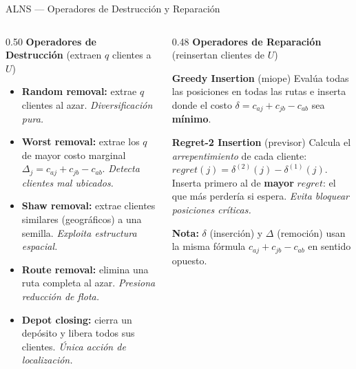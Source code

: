 \documentclass[aspectratio=169,10pt]{beamer}
\begin{document}
\begin{frame}{ALNS --- Operadores de Destrucción y Reparación}
  \begin{columns}[T,onlytextwidth]
    \begin{column}{0.50\textwidth}
      {\color{myblue}\textbf{Operadores de Destrucción}}
      {\footnotesize(extraen $q$ clientes a $U$)}
      \vspace{0.2em}
      \begin{itemize}\small\setlength{\itemsep}{0.25em}
        \item \textbf{Random removal:}
              extrae $q$ clientes al azar.
              \textit{Diversificación pura.}
        \item \textbf{Worst removal:}
              extrae los $q$ de mayor costo marginal
              $\Delta_j = c_{aj} + c_{jb} - c_{ab}$.
              \textit{Detecta clientes mal ubicados.}
        \item \textbf{Shaw removal:}
              extrae clientes similares (geográficos) a una semilla.
              \textit{Exploita estructura espacial.}
        \item \textbf{Route removal:}
              elimina una ruta completa al azar.
              \textit{Presiona reducción de flota.}
        \item \textbf{Depot closing:}
              cierra un depósito y libera todos sus clientes.
              \textit{Única acción de localización.}
      \end{itemize}
    \end{column}
    \begin{column}{0.48\textwidth}
      {\color{mygreen}\textbf{Operadores de Reparación}}
      {\footnotesize(reinsertan clientes de $U$)}
      \vspace{0.15em}
      \begin{block}{\textbf{Greedy Insertion} (miope)}\footnotesize
        Evalúa todas las posiciones en todas las rutas e inserta
        donde el costo $\delta = c_{aj}+c_{jb}-c_{ab}$ sea \textbf{mínimo}.
      \end{block}
      \vspace{0.15em}
      \begin{block}{\textbf{Regret-2 Insertion} (previsor)}\footnotesize
        Calcula el \textit{arrepentimiento} de cada cliente:
        $regret(j) = \delta^{(2)}(j) - \delta^{(1)}(j)$.\\[0.1em]
        Inserta primero al de \textbf{mayor} $regret$: el que más
        perdería si espera. \textit{Evita bloquear posiciones críticas.}
      \end{block}
      \vspace{0.15em}
      {\scriptsize\textbf{Nota:} $\delta$ (inserción) y $\Delta$ (remoción)
      usan la misma fórmula $c_{aj}+c_{jb}-c_{ab}$ en sentido opuesto.}
    \end{column}
  \end{columns}
\end{frame}
\end{document}
